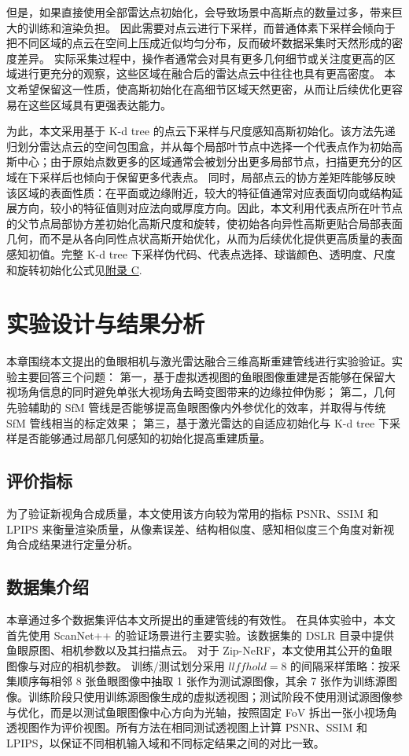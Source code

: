 但是，如果直接使用全部雷达点初始化，会导致场景中高斯点的数量过多，带来巨大的训练和渲染负担。
因此需要对点云进行下采样，而普通体素下采样会倾向于把不同区域的点云在空间上压成近似均匀分布，反而破坏数据采集时天然形成的密度差异。
实际采集过程中，操作者通常会对具有更多几何细节或关注度更高的区域进行更充分的观察，这些区域在融合后的雷达点云中往往也具有更高密度。
本文希望保留这一性质，使高斯初始化在高细节区域天然更密，从而让后续优化更容易在这些区域具有更强表达能力。

为此，本文采用基于 K-d tree 的点云下采样与尺度感知高斯初始化。该方法先递归划分雷达点云的空间包围盒，并从每个局部叶节点中选择一个代表点作为初始高斯中心；由于原始点数更多的区域通常会被划分出更多局部节点，扫描更充分的区域在下采样后也倾向于保留更多代表点。
同时，局部点云的协方差矩阵能够反映该区域的表面性质：在平面或边缘附近，较大的特征值通常对应表面切向或结构延展方向，较小的特征值则对应法向或厚度方向。因此，本文利用代表点所在叶节点的父节点局部协方差初始化高斯尺度和旋转，使初始各向异性高斯更贴合局部表面几何，而不是从各向同性点状高斯开始优化，从而为后续优化提供更高质量的表面感知初值。完整 K-d tree 下采样伪代码、代表点选择、球谐颜色、透明度、尺度和旋转初始化公式见\hyperref[app:lidar-init]{附录 C}.

\clearpage
\section{实验设计与结果分析}

本章围绕本文提出的鱼眼相机与激光雷达融合三维高斯重建管线进行实验验证。实验主要回答三个问题：
第一，基于虚拟透视图的鱼眼图像重建是否能够在保留大视场角信息的同时避免单张大视场角去畸变图带来的边缘拉伸伪影；
第二，几何先验辅助的 SfM 管线是否能够提高鱼眼图像内外参优化的效率，并取得与传统 SfM 管线相当的标定效果；
第三，基于激光雷达的自适应初始化与 K-d tree 下采样是否能够通过局部几何感知的初始化提高重建质量。

\subsection{评价指标}

为了验证新视角合成质量，本文使用该方向较为常用的指标 PSNR、SSIM \cite{wang2004image} 和 LPIPS \cite{zhang2018unreasonable} 来衡量渲染质量，从像素误差、结构相似度、感知相似度三个角度对新视角合成结果进行定量分析。

\subsection{数据集介绍}
本章通过多个数据集评估本文所提出的重建管线的有效性。
在具体实验中，本文首先使用 ScanNet++ 的验证场景进行主要实验。该数据集的 DSLR 目录中提供鱼眼原图、相机参数以及其扫描点云。
对于 Zip-NeRF，本文使用其公开的鱼眼图像与对应的相机参数。
训练/测试划分采用 \(llffhold=8\) 的间隔采样策略：按采集顺序每相邻 8 张鱼眼图像中抽取 1 张作为测试源图像，其余 7 张作为训练源图像。训练阶段只使用训练源图像生成的虚拟透视图；测试阶段不使用测试源图像参与优化，而是以测试鱼眼图像中心方向为光轴，按照固定 FoV 拆出一张小视场角透视图作为评价视图。所有方法在相同测试透视图上计算 PSNR、SSIM 和 LPIPS，以保证不同相机输入域和不同标定结果之间的对比一致。

